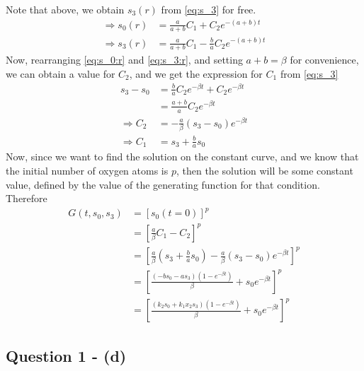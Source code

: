 \documentclass[11pt,a4paper]{article}
\begin{document}
Note that above, we obtain $s_3(r)$ from \eqref{eq:s_3} for free.
\begin{align}
\Rightarrow s_0(r) &= \frac{a}{a+b} C_1 +  C_2 e^{- (a+b) t} \label{eq:s_0:r}\\
\Rightarrow s_3(r) &= \frac{a}{a+b} C_1 -\frac{b}{a} C_2 e^{- (a+b) t} \label{eq:s_3:r}
\end{align}
Now, rearranging \eqref{eq:s_0:r} and \eqref{eq:s_3:r}, and setting $a+b=\beta$ for convenience, we can obtain a value for $C_2$, and we get the expression for $C_1$ from \eqref{eq:s_3}
\begin{align*}
s_3 - s_0 &= \frac{b}{a} C_2 e^{-\beta t} + C_2 e^{-\beta t} \\
&= \frac{a + b}{a} C_2 e^{-\beta t} \\
\Rightarrow C_2 &= - \frac{a}{\beta} (s_3 - s_0) e^{-\beta t} \\
\Rightarrow C_1 &= s_3 + \frac{b}{a} s_0
\end{align*} 
Now, since we want to find the solution on the constant curve, and we know that the initial number of oxygen atoms is $p$, then the solution will be some constant value, defined by the value of the generating function for that condition. Therefore
\begin{align*}
G(t,s_0,s_3) &= \left[ s_0(t=0) \right]^p \\
&= \left[ \frac{a}{\beta} C_1 - C_2 \right]^p \\
&= \left[ \frac{a}{\beta} (s_3 + \frac{b}{a} s_0) - \frac{a}{\beta} (s_3 - s_0) e^{-\beta t}\right]^p \\
&= \left[ \frac{(-b s_0 - a s_3) (1 - e^{-\beta t})}{\beta} + s_0 e^{-\beta t} \right]^p \\
&= \left[ \frac{(k_2 s_0 + k_1 x_2 s_3) (1 - e^{-\beta t})}{\beta} + s_0 e^{-\beta t} \right]^p 
\end{align*}
\subsection{Question 1 - (d)}
\label{sec:question1:subsec:partd}

\end{document}
